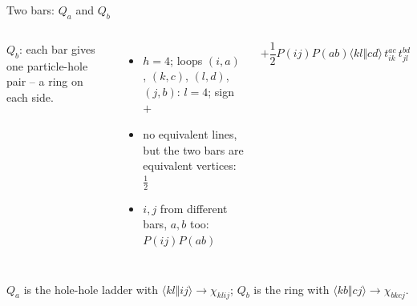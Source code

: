 \documentclass[aspectratio=169,10pt]{beamer}
\newcommand{\as}[4]{\langle #1#2\Vert #3#4\rangle}
\begin{document}
\begin{frame}[shrink=10]{Two bars: $Q_a$ and $Q_b$}
\begin{columns}[T]
\vspace{0.5em}
\raggedright
$Q_b$: each bar gives one particle-hole pair -- a ring on each side.
\begin{itemize}
\item $h=4$; loops $(i,a)$, $(k,c)$, $(l,d)$, $(j,b)$: $l=4$; sign $+$
\item no equivalent lines, but the two bars are equivalent vertices: $\tfrac12$
\item $i,j$ from different bars, $a,b$ too: $P(ij)P(ab)$
\end{itemize}
\[
 +\frac12P(ij)P(ab)\as klcd\,t_{ik}^{ac}\,t_{jl}^{bd}
\]
\end{columns}
\vspace{0.3em}
$Q_a$ is the hole-hole ladder with $\as klij\to\chi_{klij}$; $Q_b$ is the ring with $\as kbcj\to\chi_{bkcj}$.
\end{frame}
\end{document}
